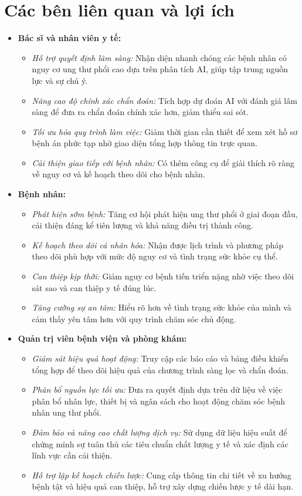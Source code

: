 \section{Các bên liên quan và lợi ích}
\begin{itemize}
    \item \textbf{Bác sĩ và nhân viên y tế:}
    \begin{itemize}
        \item \textit{Hỗ trợ quyết định lâm sàng:} Nhận diện nhanh chóng các bệnh nhân có nguy cơ ung thư phổi cao dựa trên phân tích AI, giúp tập trung nguồn lực và sự chú ý.
        \item \textit{Nâng cao độ chính xác chẩn đoán:} Tích hợp dự đoán AI với đánh giá lâm sàng để đưa ra chẩn đoán chính xác hơn, giảm thiểu sai sót.
        \item \textit{Tối ưu hóa quy trình làm việc:} Giảm thời gian cần thiết để xem xét hồ sơ bệnh án phức tạp nhờ giao diện tổng hợp thông tin trực quan.
        \item \textit{Cải thiện giao tiếp với bệnh nhân:} Có thêm công cụ để giải thích rõ ràng về nguy cơ và kế hoạch theo dõi cho bệnh nhân.
    \end{itemize}
    
    \item \textbf{Bệnh nhân:}
    \begin{itemize}
        \item \textit{Phát hiện sớm bệnh:} Tăng cơ hội phát hiện ung thư phổi ở giai đoạn đầu, cải thiện đáng kể tiên lượng và khả năng điều trị thành công.
        \item \textit{Kế hoạch theo dõi cá nhân hóa:} Nhận được lịch trình và phương pháp theo dõi phù hợp với mức độ nguy cơ và tình trạng sức khỏe cụ thể.
        \item \textit{Can thiệp kịp thời:} Giảm nguy cơ bệnh tiến triển nặng nhờ việc theo dõi sát sao và can thiệp y tế đúng lúc.
        \item \textit{Tăng cường sự an tâm:} Hiểu rõ hơn về tình trạng sức khỏe của mình và cảm thấy yên tâm hơn với quy trình chăm sóc chủ động.
    \end{itemize}

    \item \textbf{Quản trị viên bệnh viện và phòng khám:}
    \begin{itemize}
        \item \textit{Giám sát hiệu quả hoạt động:} Truy cập các báo cáo và bảng điều khiển tổng hợp để theo dõi hiệu quả của chương trình sàng lọc và chẩn đoán.
        \item \textit{Phân bổ nguồn lực tối ưu:} Đưa ra quyết định dựa trên dữ liệu về việc phân bổ nhân lực, thiết bị và ngân sách cho hoạt động chăm sóc bệnh nhân ung thư phổi.
        \item \textit{Đảm bảo và nâng cao chất lượng dịch vụ:} Sử dụng dữ liệu hiệu suất để chứng minh sự tuân thủ các tiêu chuẩn chất lượng y tế và xác định các lĩnh vực cần cải thiện.
        \item \textit{Hỗ trợ lập kế hoạch chiến lược:} Cung cấp thông tin chi tiết về xu hướng bệnh tật và hiệu quả can thiệp, hỗ trợ xây dựng chiến lược y tế dài hạn.
    \end{itemize}


\end{itemize}

